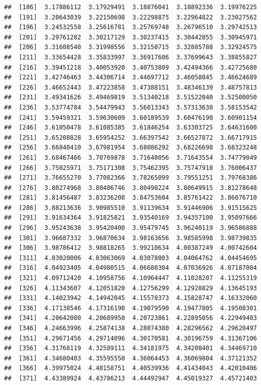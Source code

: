 \documentclass[
  11pt]{report}
\begin{document}
\begin{itemize}
\begin{verbatim}
##  [186]  3.17886112  3.17929491  3.18876041  3.18892336  3.19976225
##  [191]  3.20643039  3.22150698  3.22298875  3.22964822  3.23027562
##  [196]  3.24532558  3.25616781  3.25769748  3.26796510  3.29742513
##  [201]  3.29761282  3.30217129  3.30237415  3.30442855  3.30945971
##  [206]  3.31608540  3.31998556  3.32150715  3.32885788  3.32924575
##  [211]  3.33654428  3.35833997  3.36917606  3.37699643  3.38855827
##  [216]  3.39451218  3.40053920  3.40753809  3.42494366  3.42725680
##  [221]  3.42746463  3.44306714  3.44697712  3.46058045  3.46624689
##  [226]  3.46652443  3.47223858  3.47388151  3.48346139  3.48757813
##  [231]  3.49341626  3.49469819  3.51340218  3.51522040  3.52500050
##  [236]  3.53774784  3.54479943  3.56013343  3.57313630  3.58153542
##  [241]  3.59459321  3.59630609  3.60189539  3.60476190  3.60901154
##  [246]  3.61050478  3.61085385  3.61846254  3.63303725  3.64631600
##  [251]  3.65208828  3.65954252  3.66397542  3.66527872  3.66717915
##  [256]  3.66840410  3.67981954  3.68086292  3.68226698  3.68323248
##  [261]  3.68467466  3.70769878  3.71640056  3.71643554  3.74779049
##  [266]  3.75025971  3.75171308  3.75462395  3.75747918  3.76006437
##  [271]  3.76655270  3.77082366  3.78265099  3.79551251  3.79768386
##  [276]  3.80274968  3.80486746  3.80498224  3.80649915  3.81278648
##  [281]  3.81456487  3.83236208  3.84753604  3.85761422  3.86076710
##  [286]  3.88213636  3.90985510  3.91139634  3.91446906  3.91515625
##  [291]  3.91634364  3.91825821  3.93540169  3.94357100  3.95097666
##  [296]  3.95243638  3.95420400  3.95479745  3.96240119  3.96586888
##  [301]  3.96687332  3.96870634  3.98163656  3.98585998  3.98739835
##  [306]  3.98786412  3.98818265  3.99210634  4.00387249  4.00742604
##  [311]  4.03020006  4.03063069  4.03078003  4.04064762  4.04454695
##  [316]  4.04923405  4.04980515  4.06680304  4.07036926  4.07187004
##  [321]  4.09712420  4.10958756  4.10964447  4.11028207  4.11255319
##  [326]  4.11343607  4.12051820  4.12756299  4.12928829  4.13645193
##  [331]  4.14023942  4.14942045  4.15578373  4.15828747  4.16332060
##  [336]  4.17138546  4.17316198  4.19079590  4.19477805  4.19508301
##  [341]  4.20642080  4.20689950  4.20723861  4.22895056  4.22949403
##  [346]  4.24663996  4.25874138  4.28074380  4.28296562  4.29620497
##  [351]  4.29671456  4.29714096  4.30170581  4.30196759  4.31367106
##  [356]  4.31768119  4.32589111  4.34181975  4.34208401  4.34469710
##  [361]  4.34680403  4.35595550  4.36064453  4.36069804  4.37121352
##  [366]  4.39975024  4.40158751  4.40539936  4.41434043  4.42010406
##  [371]  4.43389924  4.43786213  4.44492947  4.45019327  4.45721403

\end{verbatim}
\end{itemize}
\end{document}
